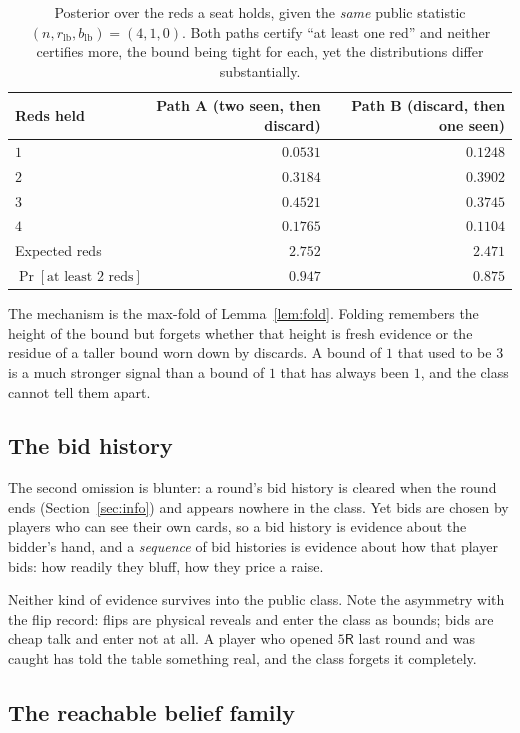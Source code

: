 \documentclass[11pt]{article}
\theoremstyle{plain}
\theoremstyle{definition}
\theoremstyle{remark}
\newcommand{\R}{\ensuremath{\mathsf{R}}}
\newcommand{\rlb}{\ensuremath{r_{\mathrm{lb}}}}
\newcommand{\blb}{\ensuremath{b_{\mathrm{lb}}}}
\begin{document}
\begin{table}[htbp]
\centering
\caption{Posterior over the reds a seat holds, given the \emph{same} public
statistic $(n,\rlb,\blb)=(4,1,0)$. Both paths certify ``at least one red''
and neither certifies more, the bound being tight for each, yet the
distributions differ substantially.}
\label{tab:paths}
\begin{tabular}{@{}lrr@{}}
\toprule
Reds held & Path A (two seen, then discard) & Path B (discard, then one seen)\\
\midrule
$1$ & $0.0531$ & $0.1248$\\
$2$ & $0.3184$ & $0.3902$\\
$3$ & $0.4521$ & $0.3745$\\
$4$ & $0.1765$ & $0.1104$\\
\midrule
Expected reds        & $2.752$ & $2.471$\\
$\Pr[\text{at least }2\text{ reds}]$ & $0.947$ & $0.875$\\
\bottomrule
\end{tabular}
\end{table}

The mechanism is the max-fold of Lemma~\ref{lem:fold}. Folding remembers
the height of the bound but forgets whether that height is fresh evidence
or the residue of a taller bound worn down by discards. A bound of $1$
that used to be $3$ is a much stronger signal than a bound of $1$ that has
always been $1$, and the class cannot tell them apart.

\subsection{The bid history}

The second omission is blunter: a round's bid history is cleared when the
round ends (Section~\ref{sec:info}) and appears nowhere in the class. Yet
bids are chosen by players who can see their own cards, so a bid history is
evidence about the bidder's hand, and a \emph{sequence} of bid histories is
evidence about how that player bids: how readily they bluff, how they
price a raise.

Neither kind of evidence survives into the public class. Note the
asymmetry with the flip record: flips are physical reveals and enter the
class as bounds; bids are cheap talk and enter not at all. A player who
opened $5\R$ last round and was caught has told the table something real,
and the class forgets it completely.

\subsection{The reachable belief family}\label{sec:belieffamily}
\end{document}
